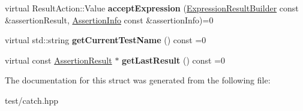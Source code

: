 \begin{DoxyCompactItemize}
\item 
virtual Result\+Action\+::\+Value {\bfseries accept\+Expression} (\hyperlink{classCatch_1_1ExpressionResultBuilder}{Expression\+Result\+Builder} const \&assertion\+Result, \hyperlink{structCatch_1_1AssertionInfo}{Assertion\+Info} const \&assertion\+Info)=0\hypertarget{structCatch_1_1IResultCapture_a76e0229ceb19405d2dd4a868ce0a1cdf}{}\label{structCatch_1_1IResultCapture_a76e0229ceb19405d2dd4a868ce0a1cdf}

\item 
virtual std\+::string {\bfseries get\+Current\+Test\+Name} () const =0\hypertarget{structCatch_1_1IResultCapture_aea1617f4a84cc648246aa3ed6918b5bf}{}\label{structCatch_1_1IResultCapture_aea1617f4a84cc648246aa3ed6918b5bf}

\item 
virtual const \hyperlink{classCatch_1_1AssertionResult}{Assertion\+Result} $\ast$ {\bfseries get\+Last\+Result} () const =0\hypertarget{structCatch_1_1IResultCapture_ab18872c89fab97405a56e9c6a4919736}{}\label{structCatch_1_1IResultCapture_ab18872c89fab97405a56e9c6a4919736}

\end{DoxyCompactItemize}


The documentation for this struct was generated from the following file\+:\begin{DoxyCompactItemize}
\item 
test/catch.\+hpp\end{DoxyCompactItemize}
